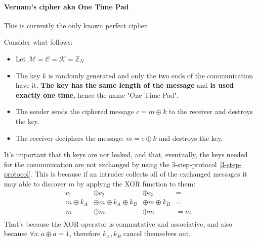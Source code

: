 \paragraph{Vernam's cipher aka One Time Pad}
This is currently the only known perfect cipher. \newline
\begin{definition}
    Consider what follows:
    \begin{itemize}
        \item Let $\mathcal{M} = \mathcal{C} = \mathcal{K} = \mathbb{Z}_{N}$
        \item The key $k$ is randomly generated and only the two ends of the communication have it. \textbf{The key has the same length of the message} and \textbf{is used exactly one time}, hence the name "One Time Pad".
        \item The sender sends the ciphered message $c = m \oplus k$ to the receiver and destroys the key.
        \item The receiver deciphers the message: $m = c \oplus k$ and destroys the key.
    \end{itemize}
\end{definition}
It's important that th keys are not leaked, and that, eventually, the keys needed for the communication are not exchanged by using the 3-step-protocol \ref{3-step-protocol}. This is because if an intruder collects all of the exchanged messages it may able to discover $m$ by applyng the XOR function to them:
\begin{align*}
    c_{1} &\oplus c_{2} &\oplus c_{3} &=\\
    m \oplus k_{A} &\oplus m \oplus k_{A} \oplus k_{B} &\oplus m \oplus k_{B} &=\\
    m &\oplus m &\oplus m &= m \\
\end{align*}
That's because the XOR operator is commutative and associative, and also because $\forall a: a \oplus a = 1$, therefore $k_{A}, k_{B}$ cancel themselves out.
